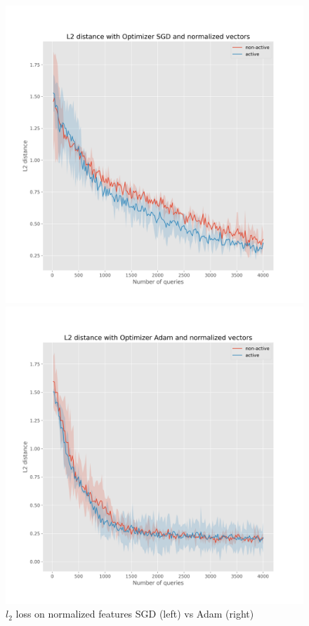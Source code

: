 \documentclass{article}
\begin{document}
\begin{figure}[h]
  \centering
  \begin{minipage}{.45\textwidth}
    \centering
    \includegraphics[width=\linewidth]{active-vs-base-moons-l2-loss-SGD-normalized-ci}
  \end{minipage}%
  \begin{minipage}{.45\textwidth}
    \centering
    \includegraphics[width=\linewidth]{active-vs-base-moons-l2-loss-Adam-normalized-ci}
  \end{minipage}
  \caption{$l_2$ loss on normalized features SGD (left) vs Adam (right)}\label{fig:l2-loss-normalized-ci-mnist}
\end{figure}
\end{document}
